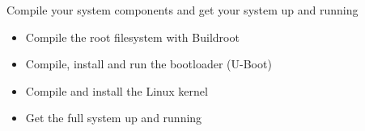 {
  Compile your system components and get your system up and running
  \begin{itemize}
  \item Compile the root filesystem with Buildroot
  \item Compile, install and run the bootloader (U-Boot)
  \item Compile and install the Linux kernel
  \item Get the full system up and running
  \end{itemize}
}
